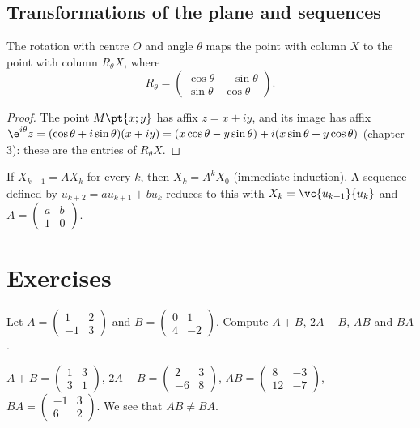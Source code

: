 \subsection{Transformations of the plane and sequences}
\begin{theorem}
The rotation with centre $O$ and angle $\theta$ maps the point with column $X$ to the point with column $R_\theta X$, where
\[R_\theta=\begin{pmatrix}\cos\theta&-\sin\theta\\\sin\theta&\cos\theta\end{pmatrix}.\]
\end{theorem}
\begin{proof}
The point $M\pt{x;y}$ has affix $z=x+iy$, and its image has affix $\e^{i\theta}z=(\cos\theta+i\sin\theta)(x+iy)=(x\cos\theta-y\sin\theta)+i(x\sin\theta+y\cos\theta)$ (chapter 3): these are the entries of $R_\theta X$.
\end{proof}
\begin{method}
If $X_{k+1}=AX_k$ for every $k$, then $X_k=A^kX_0$ (immediate induction). A sequence defined by $u_{k+2}=au_{k+1}+bu_k$ reduces to this with $X_k=\vc{u_{k+1}}{u_k}$ and $A=\begin{pmatrix}a&b\\1&0\end{pmatrix}$.
\end{method}

\mxnewpage
\section{Exercises}
\begin{exercise}[Computations]
Let $A=\begin{pmatrix}1&2\\-1&3\end{pmatrix}$ and $B=\begin{pmatrix}0&1\\4&-2\end{pmatrix}$. Compute $A+B$, $2A-B$, $AB$ and $BA$.
\end{exercise}
\begin{solution}
$A+B=\begin{pmatrix}1&3\\3&1\end{pmatrix}$, $2A-B=\begin{pmatrix}2&3\\-6&8\end{pmatrix}$, $AB=\begin{pmatrix}8&-3\\12&-7\end{pmatrix}$, $BA=\begin{pmatrix}-1&3\\6&2\end{pmatrix}$. We see that $AB\neq BA$.
\end{solution}

